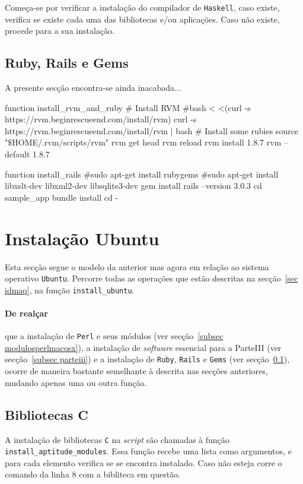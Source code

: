 Começa-se por verificar a instalação do compilador de \texttt{Haskell}, caso existe, verifica se existe cada uma das bibliotecas e/ou aplicações. Caso não existe, procede para a sua 
instalação.

\subsection{Ruby, Rails e Gems}\label{subsec rrgems}

A presente secção encontra-se ainda inacabada...

\begin{myxml}
 function install_rvm_and_ruby {
        # Install RVM
        #bash < <(curl -s https://rvm.beginrescueend.com/install/rvm)
        curl -s https://rvm.beginrescueend.com/install/rvm | bash
        # Install some rubies
        source "$\$$HOME/.rvm/scripts/rvm"
        rvm get head
        rvm reload
        rvm install 1.8.7
        rvm --default 1.8.7
}

function install_rails {
        #sudo apt-get install rubygems
        #sudo apt-get install libxslt-dev libxml2-dev libsqlite3-dev
        gem install rails --version 3.0.3
        cd sample_app
        bundle install
        cd -
}
\end{myxml}

\section{Instalação Ubuntu}
Esta secção segue o modelo da anterior mas agora em relação ao sistema operativo \texttt{Ubuntu}. Percorre todas as operações que estão descritas na secção~\ref{sec idmaq}, na 
função \texttt{install\_ubuntu}.

\paragraph{De realçar} que a instalação de \texttt{Perl} e seus módulos (ver secção~\ref{subsec modulosperlmacosx}), a instalação de \emph{software} essencial para a ParteIII
(ver secção~\ref{subsec parteiii}) e a instalação de \texttt{Ruby}, \texttt{Rails} e \texttt{Gems} (ver secção~\ref{subsec rrgems}), ocorre de maneira bastante semelhante à descrita 
nas secções anteriores, mudando apenas uma ou outra função. 

\subsection{Bibliotecas C}
A instalação de bibliotecas \texttt{C} na \emph{script} são chamadas à função \texttt{install\_aptitude\_modules}. Essa função recebe uma lista como argumentos, e para cada elemento 
verifica se se encontra instalado. Caso não esteja corre o comando da linha 8 com a bibliteca em questão.\\

